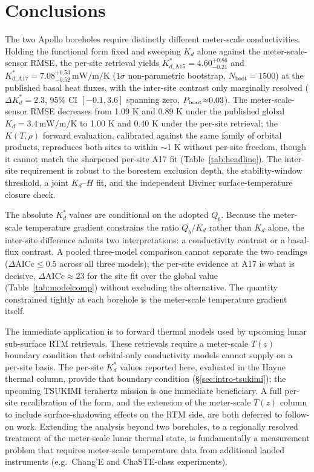 \documentclass[11pt]{article}
\begin{document}
\FloatBarrier
\section{Conclusions}\label{sec:conclusions}

The two Apollo boreholes require distinctly different
meter-scale conductivities. Holding the \citet{hayne2017}
functional form fixed and sweeping $K_d$ alone against the
meter-scale-sensor RMSE, the per-site retrieval
yields
$K_{d,\mathrm{A15}}^{*}=4.60^{+0.86}_{-0.21}$ and
$K_{d,\mathrm{A17}}^{*}=7.08^{+0.53}_{-0.52}\,\si{\milli\watt\per\meter\per\kelvin}$
($1\sigma$ non-parametric bootstrap, $N_\mathrm{boot}=1500$) at the
published basal heat fluxes, with the inter-site contrast
only marginally resolved ($\Delta K_d^{*}=2.3$, 95\% CI
$[-0.1,3.6]$ spanning zero, $P_{\rm boot}{\approx}0.03$). The
meter-scale-sensor RMSE decreases from
1.09 K and 0.89 K under the published global
$K_d=3.4\,\si{\milli\watt\per\meter\per\kelvin}$ to 1.00 K and 0.40 K under
the per-site retrieval; the \citet{martinez2021} $K(T,\rho)$ forward
evaluation, calibrated against the same family of orbital products,
reproduces both sites to within $\sim$1 K without per-site
freedom, though it cannot match the sharpened per-site A17 fit
(Table~\ref{tab:headline}). The inter-site requirement is robust to the
borestem exclusion depth, the stability-window threshold, a joint
$K_d$--$H$ fit, and the independent Diviner surface-temperature closure
check.

The absolute $K_d^{*}$ values are conditional on the adopted $Q_b$. Because
the meter-scale temperature gradient constrains the ratio
$Q_b/K_d$ rather than $K_d$ alone, the inter-site difference admits two
interpretations: a conductivity contrast or a basal-flux contrast. A pooled
three-model comparison cannot separate the two readings
($\Delta\mathrm{AICc}\le 0.5$ across all three models); the per-site
evidence at A17 is what is decisive,
$\Delta\mathrm{AICc}\approx 23$ for the site fit over the global value
(Table~\ref{tab:modelcomp}) without
excluding the alternative. The quantity constrained tightly at each
borehole is the meter-scale temperature gradient itself.

The immediate application is to forward thermal models used by upcoming
lunar sub-surface RTM retrievals. These retrievals require a
meter-scale $T(z)$ boundary condition that orbital-only
conductivity models cannot supply on a per-site basis. The per-site
$K_d^{*}$ values reported here, evaluated in the Hayne thermal column,
provide that boundary condition (\S\ref{sec:intro-tsukimi}); the upcoming
TSUKIMI terahertz mission \citep{tsukimi2022} is one immediate beneficiary.
A full per-site recalibration of the
\citet{martinez2021} form, and the
extension of the meter-scale $T(z)$ column to include
surface-shadowing effects on the RTM side, are both deferred to follow-on
work. Extending the analysis beyond two boreholes, to a regionally resolved
treatment of the meter-scale lunar thermal state, is
fundamentally a measurement problem that requires
meter-scale temperature data from additional
landed instruments (e.g.\ Chang'E and ChaSTE-class experiments).
\end{document}

